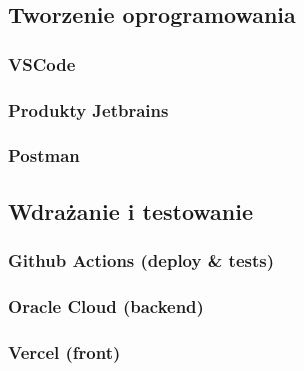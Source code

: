 \subsection{Tworzenie oprogramowania}

\subsubsection{VSCode}

\subsubsection{Produkty Jetbrains}

\subsubsection{Postman}


\subsection{Wdrażanie i testowanie}

\subsubsection{Github Actions (deploy \& tests)}


\subsubsection{Oracle Cloud (backend)}

\subsubsection{Vercel (front)}
